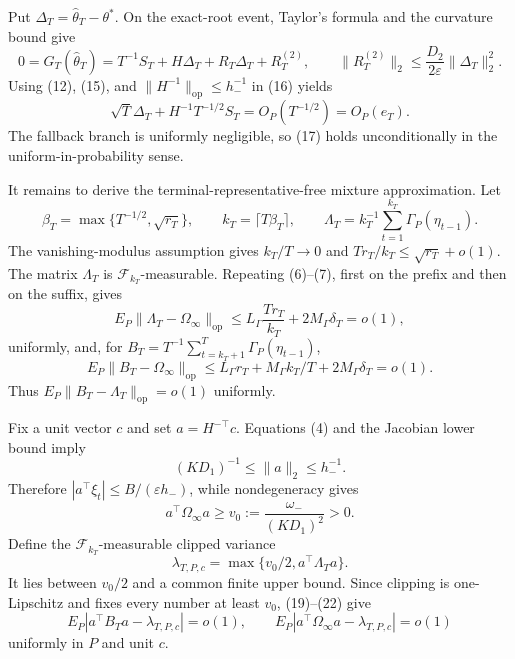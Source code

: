 Put \(\Delta_T=\widehat\theta_T-\theta^*\). On the exact-root event, Taylor's formula and the curvature bound give
\[
 0=G_T(\widehat\theta_T)
 =T^{-1}S_T+H\Delta_T+R_T\Delta_T+R_T^{(2)},
 \qquad \|R_T^{(2)}\|_2\le\frac{D_2}{2\varepsilon}\|\Delta_T\|_2^2. \tag{16}
\]
Using (12), (15), and \(\|H^{-1}\|_{\mathrm{op}}\le h_-^{-1}\) in (16) yields
\[
 \sqrt T\Delta_T+H^{-1}T^{-1/2}S_T
 =O_P(T^{-1/2})=O_P(e_T). \tag{17}
\]
The fallback branch is uniformly negligible, so (17) holds unconditionally in the uniform-in-probability sense.

It remains to derive the terminal-representative-free mixture approximation. Let
\[
 \beta_T=\max\{T^{-1/2},\sqrt{r_T}\},\qquad
 k_T=\lceil T\beta_T\rceil,\qquad
 \Lambda_T=k_T^{-1}\sum_{t=1}^{k_T}\Gamma_P(\eta_{t-1}). \tag{18}
\]
The vanishing-modulus assumption gives \(k_T/T\to0\) and \(Tr_T/k_T\le\sqrt{r_T}+o(1)\). The matrix \(\Lambda_T\) is \(\mathcal F_{k_T}\)-measurable. Repeating (6)--(7), first on the prefix and then on the suffix, gives
\[
 E_P\|\Lambda_T-\Omega_\infty\|_{\mathrm{op}}
 \le L_\Gamma\frac{Tr_T}{k_T}+2M_\Gamma\delta_T=o(1), \tag{19}
\]
uniformly, and, for \(B_T=T^{-1}\sum_{t=k_T+1}^T\Gamma_P(\eta_{t-1})\),
\[
 E_P\|B_T-\Omega_\infty\|_{\mathrm{op}}
 \le L_\Gamma r_T+M_\Gamma k_T/T+2M_\Gamma\delta_T=o(1). \tag{20}
\]
Thus \(E_P\|B_T-\Lambda_T\|_{\mathrm{op}}=o(1)\) uniformly.

Fix a unit vector \(c\) and set \(a=H^{-\top}c\). Equations (4) and the Jacobian lower bound imply
\[
 (KD_1)^{-1}\le\|a\|_2\le h_-^{-1}. \tag{21}
\]
Therefore \(|a^\top\xi_t|\le B/(\varepsilon h_-)\), while nondegeneracy gives
\[
 a^\top\Omega_\infty a\ge v_0:=\frac{\omega_-}{(KD_1)^2}>0. \tag{22}
\]
Define the \(\mathcal F_{k_T}\)-measurable clipped variance
\[
 \lambda_{T,P,c}=\max\{v_0/2,a^\top\Lambda_Ta\}. \tag{23}
\]
It lies between \(v_0/2\) and a common finite upper bound. Since clipping is one-Lipschitz and fixes every number at least \(v_0\), (19)--(22) give
\[
 E_P|a^\top B_Ta-\lambda_{T,P,c}|=o(1),
 \qquad E_P|a^\top\Omega_\infty a-\lambda_{T,P,c}|=o(1) \tag{24}
\]
uniformly in \(P\) and unit \(c\).

